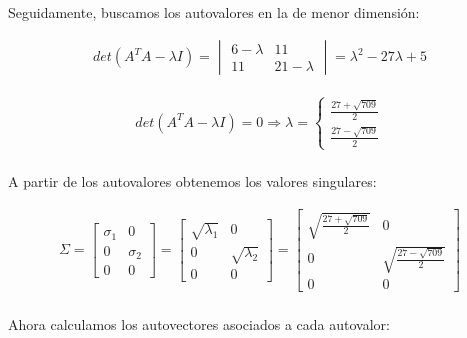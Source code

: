 \documentclass[a4paper, spanish]{article}
\begin{document}
  \paragraph{}
  Seguidamente, buscamos los autovalores en la de menor dimensión:

  \begin{align}
    det(A^T A - \lambda I)
    = \begin{vmatrix}
      6 - \lambda & 11 \\
      11 & 21 - \lambda
    \end{vmatrix}
    = \lambda ^ 2 - 27 \lambda + 5
  \end{align}


  \begin{align}
    det(A^T A - \lambda I) = 0
    \Rightarrow
    \lambda =
    \begin{cases}
    \frac{27 + \sqrt{709}}{2} \\
    \frac{27 - \sqrt{709}}{2}
    \end{cases}
  \end{align}

  \paragraph{}
  A partir de los autovalores obtenemos los valores singulares:

  \begin{align}
    \Sigma =
    \begin{bmatrix}
      \sigma_1 & 0 \\
      0 & \sigma_2 \\
      0 & 0
    \end{bmatrix}
    =
    \begin{bmatrix}
      \sqrt{\lambda_1} & 0 \\
      0 & \sqrt{\lambda_2} \\
      0 & 0
    \end{bmatrix} =
    \begin{bmatrix}
      \sqrt{\frac{27 + \sqrt{709}}{2}} & 0 \\
      0 & \sqrt{\frac{27 - \sqrt{709}}{2}} \\
      0 & 0
    \end{bmatrix}
  \end{align}

  \paragraph{}
  Ahora calculamos los autovectores asociados a cada autovalor:
\end{document}
